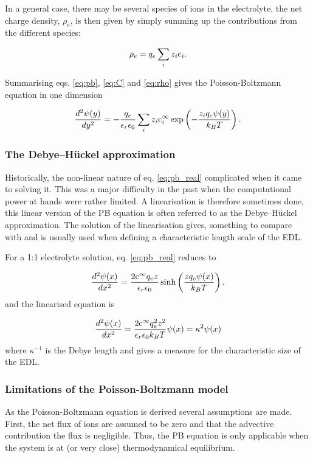 In a general case, there may be several species of ions in the
electrolyte, the net charge density, $\rho_e$, is then given by simply
summing up the contributions from the different species:

\begin{equation}\label{eq:rho}
\rho_e = q_e\sum_i z_i \mathrm{c}_i.
\end{equation}

Summarising eqs. \eqref{eq:pb}, \eqref{eq:C} and \eqref{eq:rho} gives
the Poisson-Boltzmann equation in one dimension

\begin{equation}\label{eq:pb_real}
\dfrac{d^2\mathrm{\psi}(y)}{dy^2} = -\frac{q_e}{\epsilon_r \epsilon_0}\sum_i z_i
\mathrm{c}_i^{\infty} \exp\left(-\frac{z_i q_e \mathrm{\psi}(y)}{k_BT}\right).
\end{equation}

\subsubsection{The Debye–Hückel approximation}
Historically, the non-linear nature of eq. \eqref{eq:pb_real}
complicated when it came to solving it. This was a major difficulty in
the past when the computational power at hands were rather limited. A
linearisation is therefore sometimes done, this linear version of the
PB equation is often referred to as the Debye–Hückel
approximation. The solution of the linearisation gives, something to
compare with and is usually used when defining a characteristic length
scale of the EDL.

For a 1:1 electrolyte solution, eq. \eqref{eq:pb_real} reduces to

\begin{equation}
\frac{d^2\psi(x)}{dx^2} = \frac{2\mathrm{c}^{\infty}q_ez}{\epsilon_r
  \epsilon_0}
\sinh\left(\frac{z q_e \psi(x)}{k_BT}\right).
\end{equation}
and the linearised equation is

\begin{equation}
\frac{d^2\psi(x)}{dx^2} = \frac{2\mathrm{c}^{\infty}q_e^2z^2}{\epsilon_r
  \epsilon_0 k_B T} \psi(x) = \kappa^2 \psi(x)
\end{equation}
where $\kappa^{-1}$ is the Debye length and gives a measure for the
characteristic size of the EDL.

\subsubsection{Limitations of the Poisson-Boltzmann model}
As the Poisson-Boltzmann equation is derived several assumptions are
made. First, the net flux of ions are assumed to be zero and that the
advective contribution the flux is negligible. Thus, the PB equation is
only applicable when the system is at (or very close) thermodynamical
equilibrium.

